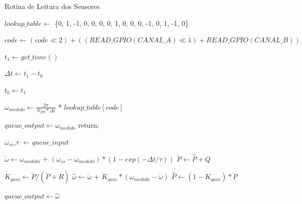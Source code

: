 \begin{algorithm}
\caption{Rotina de Leitura dos Sensores}
\label{alg:rotina_leitura_sensores}
\begin{algorithmic}[1]
  \State $lookup\_table \gets $ \{0, 1, -1, 0, 0, 0, 0, 1, 0, 0, 0, -1, 0, 1, -1, 0\}

  \State $code \gets \left(code \ll 2\right) + \left(\left(READ\_GPIO(CANAL\_A)\ll1\right)+READ\_GPIO(CANAL\_B)\right)$

  \State $t_1 \gets get\_time()$ 
  
  \State $\Delta{t} \gets  t_1 - t_0$
  
  \State $t_0 \gets t_1$ 
  
  \State $\omega_{medido} \gets \frac{2\pi}{N_{PR}*\Delta{t}}$ * $lookup\_table[code]$
  
   
    \State $queue\_output \gets \omega_{medido}$  
    \State return;
  \EndIf
  
  \State $\omega_{ss}$,$\tau$ $\gets  queue\_input$

  \State $\check{\omega} \gets \omega_{medido}$ + $( \omega_{ss} - \omega_{medido} ) * (1 - exp(-\Delta{t}/\tau))$
  \State $\check{P} \gets \hat{P} + Q$


  \State $K_{gain} \gets \check{P} / (\check{P} + R)$
  \State $\hat{\omega} \gets \check{\omega}$ + $K_{gain} * (\omega_{medido} - \check{\omega})$
  \State $\hat{P} \gets (1 - K_{gain}) * \check{P}$ 
  
  \State $queue\_output \gets \hat{\omega}$
\end{algorithmic}
\end{algorithm}
